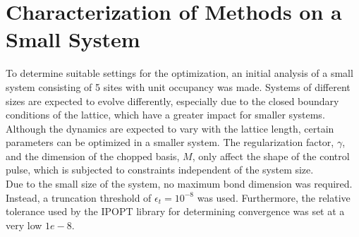 \section{Characterization of Methods on a Small System} \label{sec:5partOptimization}
To determine suitable settings for the optimization, an initial analysis of a small system consisting of 5 sites with unit occupancy was made. Systems of different sizes are expected to evolve differently, especially due to the closed boundary conditions of the lattice, which have a greater impact for smaller systems. Although the dynamics are expected to vary with the lattice length, certain parameters can be optimized in a smaller system. The regularization factor, $\gamma$, and the dimension of the chopped basis, $M$, only affect the shape of the control pulse, which is subjected to constraints independent of the system size.\\
Due to the small size of the system, no maximum bond dimension was required. Instead, a truncation threshold of $\epsilon_t = 10^{-8}$ was used. Furthermore, the relative tolerance used by the IPOPT library for determining convergence was set at a very low $1e-8$. 

